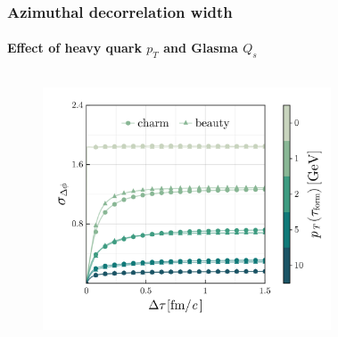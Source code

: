 \documentclass[aspectratio=169,11pt,usenames,dvipsnames]{beamer}
\begin{document}
\begin{frame}
\begin{center}
\begin{columns}[onlytextwidth,t]
\begin{figure}
            \end{figure}
        \end{columns}    
    \end{center}

\end{frame}

\begin{frame}[noframenumbering]
    \frametitle{Azimuthal decorrelation width}
    \framesubtitle{Effect of heavy quark $p_T$ and Glasma $Q_s$}
    {\begin{center}
        \begin{columns}[onlytextwidth,t]
           \begin{figure}
                \centering
                \vspace{5pt}
                \includegraphics[width=\columnwidth]{images/sigma_dphideta_tau_charm_beauty_pT_dep_final_azimuth.png}
            \end{figure}
            \vspace{-17pt}
            \begin{figure}
                \centering

\end{figure}
\end{columns}
\end{center}}
\end{frame}
\end{document}
